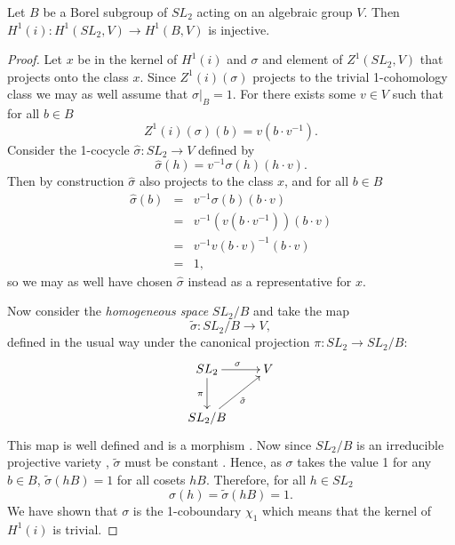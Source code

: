 \begin{lemma} Let $B$ be a Borel subgroup of $SL_2$ acting on an algebraic group $V$. Then $H^1(i):H^1(SL_2, V)\rightarrow H^1(B, V)$ is injective.
\end{lemma}
\begin{proof}
Let $x$ be in the kernel of $H^1(i)$ and $\sigma$ and element of $Z^1(SL_2, V)$ that projects onto the class $x$. Since $Z^1(i)(\sigma)$ projects to the trivial 1-cohomology class we may as well assume that $\sigma|_B = 1$. For there exists some $v \in V$ such that for all $b \in B$
\begin{displaymath}
	Z^1(i)(\sigma)(b) = v (b \cdot v^{-1}).
\end{displaymath}
Consider the 1-cocycle $\hat{\sigma}:SL_2\rightarrow V$ defined by
\begin{displaymath}
	\hat{\sigma}(h) = v^{-1} \sigma(h) (h \cdot v).
\end{displaymath}
Then by construction $\hat{\sigma}$ also projects to the class $x$, and for all $b \in B$
\begin{eqnarray*}
	\hat{\sigma}(b) &=& v^{-1} \sigma(b) (b \cdot v) \\
	&=& v^{-1} (v (b\cdot v^{-1})) (b \cdot v)\\
	&=& v^{-1} v (b\cdot v)^{-1} (b \cdot v)\\
	&=& 1,
\end{eqnarray*}
so we may as well have chosen $\hat{\sigma}$ instead as a representative for $x$. 

Now consider the \emph{homogeneous space} $SL_2/B$ \cite{humphreys1975linear} and take the map 
\begin{displaymath}
	\tilde{\sigma}:SL_2/B \rightarrow V,
\end{displaymath}
defined in the usual way under the canonical projection $\pi:SL_2 \rightarrow SL_2/B$:
\begin{displaymath}
	\xymatrix{
	SL_2 \ar[r]^{\sigma} \ar[d]_{\pi} & V\\
	SL_2/B \ar[ru]_{\tilde{\sigma}}
	}
\end{displaymath}
This map is well defined and is a morphism \cite{borel1991linear}. Now since $SL_2/B$ is an irreducible projective variety \cite{humphreys1975linear}, $\tilde{\sigma}$ must be constant  \cite{borel1991linear}. Hence, as $\sigma$ takes the value 1 for any $b \in B$, $\tilde{\sigma}(hB) = 1$ for all cosets $hB$. Therefore, for all $h \in SL_2$
\begin{displaymath}
	\sigma(h) = \tilde{\sigma}(hB) = 1.
\end{displaymath}
We have shown that $\sigma$ is the 1-coboundary $\chi_1$ which means that the kernel of $H^1(i)$ is trivial.
\end{proof} 

